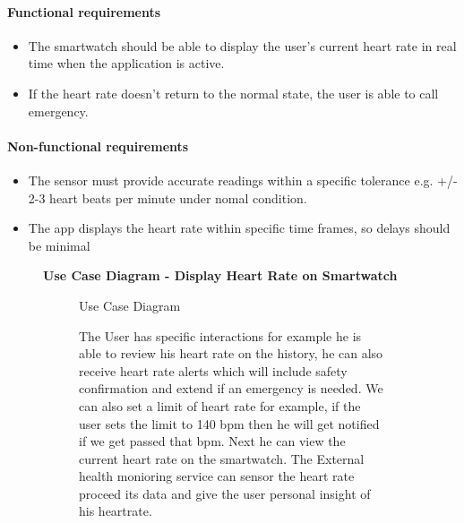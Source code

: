 \documentclass{article}
\begin{document}
	\paragraph{Functional requirements}
		\begin{itemize}
			\item The smartwatch should be able to display the user's current heart rate in real time when the application is active.
			\item If the heart rate doesn't return to the normal state, the user is able to call emergency. 
		\end{itemize}
		
	\paragraph{Non-functional requirements}
		\begin{itemize}
			\item The sensor must provide accurate readings within a specific tolerance e.g. +/- 2-3 heart beats per minute under nomal condition. 
			\item The app displays the heart rate within specific time frames, so delays should be minimal
		\end{itemize}
		 \clearpage

	\begin{figure}[htbp]
		\textbf{Use Case Diagram - Display Heart Rate on Smartwatch}
		\centering
		\begin{subfigure}{\textwidth}
			\resizebox{\textwidth}{!}{}
			\caption{Use Case Diagram}
		\end{subfigure}
		\begin{subfigure}{\textwidth}
			The User has specific interactions for example he is able to review his heart rate on the history, he can also receive
			heart rate alerts which will include safety confirmation and extend if an emergency is needed. We can also set a limit of heart rate for example,
			if the user sets the limit to 140 bpm then he will get notified if we get passed that bpm. Next he can view the current heart rate on the smartwatch.
			The External health monioring service can sensor the heart rate proceed its data and give the user personal insight of his heartrate. 
		\end{subfigure}
	\end{figure}
	\clearpage
\end{document}
